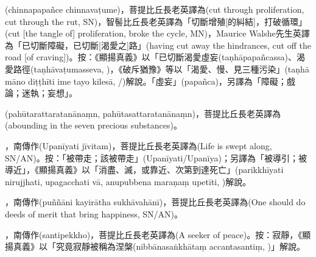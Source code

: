 \startitemgroup[noteitems]
\item{}(chinnapapañce chinnavaṭume)，菩提比丘長老英譯為(cut through proliferation, cut through the rut, SN)，智髻比丘長老英譯為「切斷增殖[的糾結]，打破循環」(cut [the tangle of] proliferation, broke the cycle, MN)，Maurice Walshe先生英譯為「已切斷障礙，已切斷[渴愛之]路」(having cut away the hindrances, cut off the road [of craving])。按：《顯揚真義》以「已切斷渴愛虛妄(taṇhāpapañcassa)、渴愛路徑(taṇhāvaṭumasseva, )，《破斥猶豫》等以「渴愛、慢、見三種污染」(taṇhā māno diṭṭhīti ime tayo kilesā, /)解說。「虛妄」(papañca)，另譯為「障礙；戲論；迷執；妄想」。
\stopitemgroup

\startitemgroup[noteitems]
\item{}(pahūtarattaratanānaṃn, pahūtasattaratanānaṃn)，菩提比丘長老英譯為(abounding in the seven precious substances)。
\stopitemgroup

\startitemgroup[noteitems]
\item{}，南傳作(Upanīyati jīvitam)，菩提比丘長老英譯為(Life is swept along, SN/AN)。按：「被帶走；該被帶走」(Upanīyati/Upanīya)；另譯為「被導引；被導近」，《顯揚真義》以「消盡、滅，或靠近、次第到達死亡」(parikkhīyati nirujjhati, upagacchati vā, anupubbena maraṇaṃ upetīti, )解說。
\item{}，南傳作(puññāni kayirātha sukhāvahānī)，菩提比丘長老英譯為(One should do deeds of merit that bring happiness, SN/AN)。
\item{}，南傳作(santipekkho)，菩提比丘長老英譯為(A seeker of peace)。按：寂靜，《顯揚真義》以「究竟寂靜被稱為涅槃(nibbānasaṅkhātaṃ accantasantiṃ, )」解說。
\stopitemgroup

